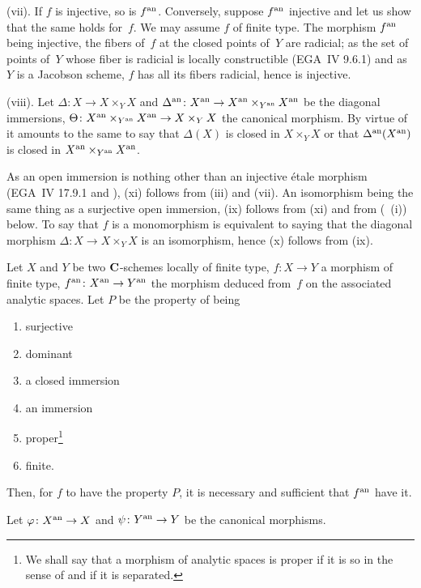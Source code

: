 (vii). If $f$ is injective, so is $f^{\mathrm{an}}$.
Conversely, suppose $f^{\mathrm{an}}$ injective and let us show that the same holds
for~$f$. We may assume
$f$ of finite type. The morphism $f^{\mathrm{an}}$ being injective, the fibers
of~$f$ at the closed points of~$Y$ are radicial; as the set
of points of~$Y$ whose fiber is radicial is locally
constructible (EGA~IV 9.6.1) and as $Y$ is a Jacobson
scheme, $f$ has all its fibers radicial, hence is injective.

(viii). Let $\Delta \colon X \to X \times_Y X $ and $\Delta^\an
\colon X^\an \to X^\an \times_{Y^\an} X^\an $ be the diagonal
immersions, $\Theta \colon X^\an \times_{Y^\an} X^\an \to X \times_Y X
$ the canonical morphism. By virtue of~ it amounts to the
same to say that $\Delta (X)$ is closed in $X \times_Y X $
or that $\Delta^{\mathrm{an}} (X^{\mathrm{an}})$ is closed in $X^{\mathrm{an}} \times_{Y^{\mathrm{an}}}
X^{\mathrm{an}}$.

As an open immersion is nothing other than an injective étale
morphism (EGA~IV 17.9.1 and \cite[ \S 1]{XII.4}), (xi) follows from (iii)
and (vii). An isomorphism being the same thing as a surjective
open immersion, (ix) follows from (xi) and from
(~(i)) below. To say that $f$ is a monomorphism
is equivalent to saying that the diagonal morphism $\Delta \colon X \to
X \times_Y X$ is an isomorphism, hence (x) follows from (ix).

\begin{proposition}
\label{XII.3.2}
Let $X$ and $Y$ be two $\mathbf{C}$-schemes locally of finite type,
$f\colon X \to Y$ a morphism of finite type, $f^\an \colon X^\an \to
Y^\an $ the morphism deduced from~$f$ on the associated
analytic spaces. Let $P$ be the property of being
\begin{enumerate}
\item[(i)] surjective
\item[(ii)] dominant
\item[(iii)] a closed immersion
\item[(iv)] an immersion
\item[(v)] proper\footnote{We shall say that a morphism of analytic
spaces is proper if it is so in the sense of \cite[ch \S 10 ]{XII.1} and
if it is separated.}
\item[(vi)]
finite.
\end{enumerate}
Then, for $f$ to have the property $P$, it is necessary and
sufficient that $f^{\mathrm{an}}$ have it.
\end{proposition}

Let $\varphi \colon X^\an \to X$ and $\psi \colon Y^\an \to Y$ be the
canonical morphisms.

